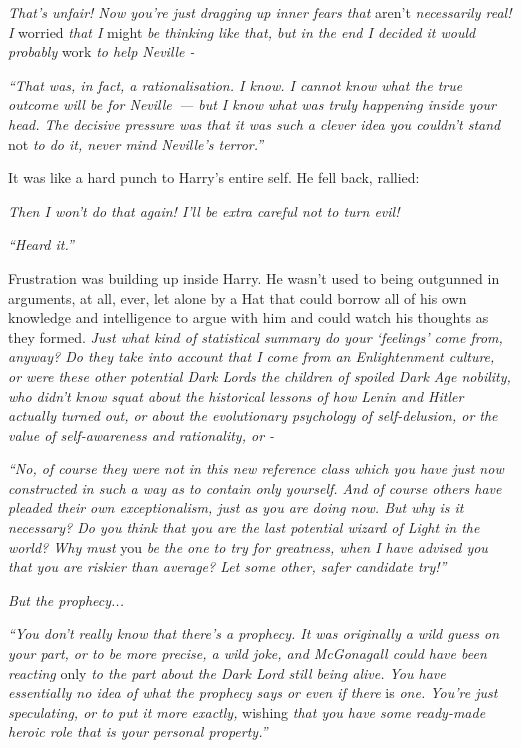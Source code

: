 \emph{That's unfair! Now you're just dragging up inner fears that} aren't \emph{necessarily real! I} worried \emph{that I} might \emph{be thinking like that, but in the end I decided it would probably} work \emph{to help Neville -}

\emph{``That was, in fact, a rationalisation. I know. I cannot know what the true outcome will be for Neville~--- but I know what was truly happening inside your head. The decisive pressure was that it was such a clever idea you couldn't stand} not \emph{to do it, never mind Neville's terror.''}

It was like a hard punch to Harry's entire self. He fell back, rallied:

\emph{Then I won't do that again! I'll be extra careful not to turn evil!}

\emph{``Heard it.''}

Frustration was building up inside Harry. He wasn't used to being outgunned in arguments, at all, ever, let alone by a Hat that could borrow all of his own knowledge and intelligence to argue with him and could watch his thoughts as they formed. \emph{Just what kind of statistical summary do your `feelings' come from, anyway? Do they take into account that I come from an Enlightenment culture, or were these other potential Dark Lords the children of spoiled Dark Age nobility, who didn't know squat about the historical lessons of how Lenin and Hitler actually turned out, or about the evolutionary psychology of self-delusion, or the value of self-awareness and rationality, or -}

\emph{``No, of course they were not in this new reference class which you have just now constructed in such a way as to contain only yourself. And of course others have pleaded their own exceptionalism, just as you are doing now. But why is it necessary? Do you think that you are the last potential wizard of Light in the world? Why must} you \emph{be the one to try for greatness, when I have advised you that you are riskier than average? Let some other, safer candidate try!''}

\emph{But the prophecy...}

\emph{``You don't really know that there's a prophecy. It was originally a wild guess on your part, or to be more precise, a wild joke, and McGonagall could have been reacting} only \emph{to the part about the Dark Lord still being alive. You have essentially no idea of what the prophecy says or even if there} is \emph{one. You're just speculating, or to put it more exactly,} wishing \emph{that you have some ready-made heroic role that is your personal property.''}

